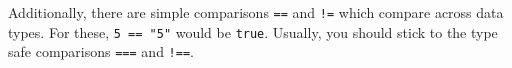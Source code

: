 \documentclass[10pt,a4paper]{article}
\begin{document}
\begin{multicols}{3}
Additionally, there are simple comparisons \texttt{==} and \texttt{!=} which compare across data types. For these, \texttt{5 == "5"} would be \texttt{true}. Usually, you should stick to the type safe comparisons \texttt{===} and \texttt{!==}.




\printbibliography
{}
\end{multicols}
\end{document}
